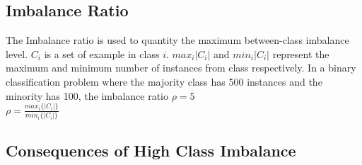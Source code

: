 \subsection{Imbalance Ratio}
The Imbalance ratio is used to quantity the maximum between-class imbalance level. $C_i$ is a set of example in class $i$. $max_i{|C_i|}$ and $min_i{|C_i|}$ represent the maximum and minimum number of instances from class  respectively. In a binary classification problem where the majority class has 500 instances and the minority has 100, the imbalance ratio $\rho = 5$\\

$\rho = \frac{max_i\{|C_i|\}}{min_i\{|C_i|\}}$

\subsection{Consequences of High Class Imbalance}